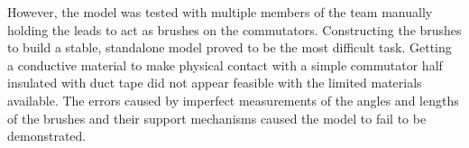     \noindent
    However, the model was tested with multiple members of the team manually holding the leads to act as brushes on the commutators. Constructing the brushes to build a stable, standalone model proved to be the most difficult task. Getting a conductive material to make physical contact with a simple commutator half insulated with duct tape did not appear feasible with the limited materials available. The errors caused by imperfect measurements of the angles and lengths of the brushes and their support mechanisms caused the model to fail to be demonstrated.
